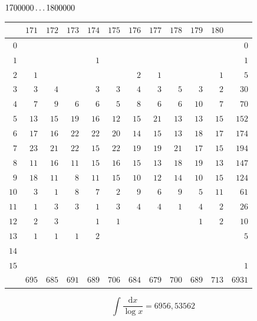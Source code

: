 \par\medskip
\noindent\begin{minipage}{\linewidth}\centering
{}
\(1700000\mathinner{.\,.\,.}1800000\)\par\smallskip
\begingroup\fontsize{10.5}{11.5}\selectfont\setlength{\tabcolsep}{3.5pt}\renewcommand{\arraystretch}{1}
\begin{tabular}{r|rrrrrrrrrr|r}\hline
 & $171$ & $172$ & $173$ & $174$ & $175$ & $176$ & $177$ & $178$ & $179$ & $180$ &  \\ \hline
$0$ &  &  &  &  &  &  &  &  &  &  & $0$ \\
$1$ &  &  &  & $1$ &  &  &  &  &  &  & $1$ \\
$2$ & $1$ &  &  &  &  & $2$ & $1$ &  &  & $1$ & $5$ \\
$3$ & $3$ & $4$ &  & $3$ & $3$ & $4$ & $3$ & $5$ & $3$ & $2$ & $30$ \\
$4$ & $7$ & $9$ & $6$ & $6$ & $5$ & $8$ & $6$ & $6$ & $10$ & $7$ & $70$ \\
$5$ & $13$ & $15$ & $19$ & $16$ & $12$ & $15$ & $21$ & $13$ & $13$ & $15$ & $152$ \\
$6$ & $17$ & $16$ & $22$ & $22$ & $20$ & $14$ & $15$ & $13$ & $18$ & $17$ & $174$ \\
$7$ & $23$ & $21$ & $22$ & $15$ & $22$ & $19$ & $19$ & $21$ & $17$ & $15$ & $194$ \\
$8$ & $11$ & $16$ & $11$ & $15$ & $16$ & $15$ & $13$ & $18$ & $19$ & $13$ & $147$ \\
$9$ & $18$ & $11$ & $8$ & $11$ & $15$ & $10$ & $12$ & $14$ & $10$ & $15$ & $124$ \\
$10$ & $3$ & $1$ & $8$ & $7$ & $2$ & $9$ & $6$ & $9$ & $5$ & $11$ & $61$ \\
$11$ & $1$ & $3$ & $3$ & $1$ & $3$ & $4$ & $4$ & $1$ & $4$ & $2$ & $26$ \\
$12$ & $2$ & $3$ &  & $1$ & $1$ &  &  &  & $1$ & $2$ & $10$ \\
$13$ & $1$ & $1$ & $1$ & $2$ &  &  &  &  &  &  & $5$ \\
$14$ &  &  &  &  &  &  &  &  &  &  &  \\
$15$ &  &  &  &  &  &  &  &  &  &  & $1$ \\
\hline
 & $695$ & $685$ & $691$ & $689$ & $706$ & $684$ & $679$ & $700$ & $689$ & $713$ & $6931$ \\ \hline
\end{tabular}\par\endgroup
\setlength{\abovedisplayskip}{6pt}\setlength{\belowdisplayskip}{4pt}
\[\int\frac{\mathrm{d}x}{\log x}=6956{,}53562\]
\end{minipage}\par
